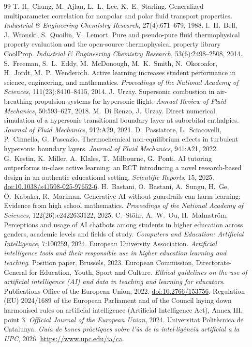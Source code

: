 \documentclass[11pt]{article}
\begin{document}
\begin{thebibliography}{99}
 T.-H.\ Chung, M.\ Ajlan, L.\ L.\ Lee, K.\ E.\ Starling. Generalized
multiparameter correlation for nonpolar and polar fluid transport properties.
\emph{Industrial \& Engineering Chemistry Research}, 27(4):671--679, 1988.
 I.\ H.\ Bell, J.\ Wronski, S.\ Quoilin, V.\ Lemort. Pure and
pseudo-pure fluid thermophysical property evaluation and the open-source thermophysical
property library CoolProp. \emph{Industrial \& Engineering Chemistry Research},
53(6):2498--2508, 2014.
 S.\ Freeman, S.\ L.\ Eddy, M.\ McDonough, M.\ K.\ Smith, N.\ Okoroafor,
H.\ Jordt, M.\ P.\ Wenderoth. Active learning increases student performance in science,
engineering, and mathematics. \emph{Proceedings of the National Academy of Sciences},
111(23):8410--8415, 2014.
 J.\ Urzay. Supersonic combustion in air-breathing propulsion systems for
hypersonic flight. \emph{Annual Review of Fluid Mechanics}, 50:593--627, 2018.
 M.\ Di Renzo, J.\ Urzay. Direct numerical simulation of a
hypersonic transitional boundary layer at suborbital enthalpies. \emph{Journal of Fluid
Mechanics}, 912:A29, 2021.
 D.\ Passiatore, L.\ Sciacovelli, P.\ Cinnella, G.\ Pascazio.
Thermochemical non-equilibrium effects in turbulent hypersonic boundary layers.
\emph{Journal of Fluid Mechanics}, 941:A21, 2022.
 G.\ Kestin, K.\ Miller, A.\ Klales, T.\ Milbourne, G.\ Ponti. AI tutoring
outperforms in-class active learning: an RCT introducing a novel research-based design in an
authentic educational setting. \emph{Scientific Reports}, 15, 2025.
\href{https://doi.org/10.1038/s41598-025-97652-6}{doi:10.1038/s41598-025-97652-6}.
 H.\ Bastani, O.\ Bastani, A.\ Sungu, H.\ Ge, \"O.\ Kabakc\i{}, R.\
Mariman. Generative AI without guardrails can harm learning: Evidence from high school
mathematics. \emph{Proceedings of the National Academy of Sciences}, 122(26):e2422633122,
2025.
 C.\ St\"ohr, A.\ W.\ Ou, H.\ Malmstr\"om. Perceptions and usage of AI
chatbots among students in higher education across genders, academic levels and fields of
study. \emph{Computers and Education: Artificial Intelligence}, 7:100259, 2024.
\bibitem{EUA2023} European University Association. \emph{Artificial intelligence tools and
their responsible use in higher education learning and teaching}. Position paper,
Brussels, 2023.
 European Commission, Directorate-General for Education, Youth, Sport and
Culture. \emph{Ethical guidelines on the use of artificial intelligence (AI) and data in
teaching and learning for educators}. Publications Office of the European Union, 2022.
\href{https://data.europa.eu/doi/10.2766/153756}{doi:10.2766/153756}.
\bibitem{AIAct2024} Regulation (EU) 2024/1689 of the European Parliament and of the Council
laying down harmonised rules on artificial intelligence (Artificial Intelligence Act),
Annex III, point 3. \emph{Official Journal of the European Union}, 2024.
\bibitem{UPCAI2026} Universitat Polit\`ecnica de Catalunya. \emph{Guia de bones pr\`actiques
sobre l'\'us de la intel$\cdot$lig\`encia artificial a la UPC}, 2026.
\url{https://www.upc.edu/ia/ca}.
\end{thebibliography}
\end{document}
